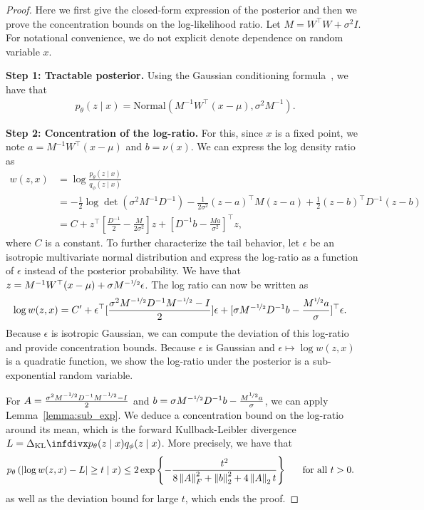 \begin{proof}
    Here we first give the closed-form expression of the posterior and then we prove the concentration bounds on the log-likelihood ratio. Let $M = W^\top W+\sigma^2I$. For notational convenience, we do not explicit denote dependence on random variable $x$.
    
    \textbf{Step 1: Tractable posterior.} Using the Gaussian conditioning formula~\cite{Bishop:2006:PRM:1162264}, we have that 
    \begin{align}
        p_\theta(z \mid x) = \textrm{Normal}\left(M^{-1}W^\top (x - \mu), \sigma^2M^{-1}\right).
    \end{align} 
    
    \textbf{Step 2: Concentration of the log-ratio.} For this, since $x$ is a fixed point, we note $a = M^{-1}W^\top (x - \mu)$ and $b = \nu(x)$. We can express the log density ratio as
    \begin{align}
        w(z, x) &= \log \frac{p_\theta(z \mid x)}{q_\phi(z \mid x)} \\
        &= -\frac{1}{2}\log\det(\sigma^2M^{-1} D^{-1}) -\frac{1}{2\sigma^2}(z - a)^\top M(z-a) + \frac{1}{2}(z - b)^\top D^{-1}(z - b) \\
        &= C + z^\top [\frac{D^{-1}}{2}-\frac{M}{2\sigma^2}]z + [D^{-1}b -\frac{Ma}{\sigma^2}]^\top z,
    \end{align}
    where $C$ is a constant. To further characterize the tail behavior, let $\epsilon$ be an isotropic multivariate normal distribution and express the log-ratio as a function of $\epsilon$ instead of the posterior probability. We have that $z = M^{-1}W^\top (x - \mu) + \sigma M^{-\nicefrac{1}{2}}\epsilon$. The log ratio can now be written as
    \begin{align}
        \log w(z, x) &= C' + \epsilon^\top [\frac{\sigma^2M^{-\nicefrac{1}{2}}D^{-1}M^{-\nicefrac{1}{2}} - I}{2}]\epsilon + [\sigma M^{-\nicefrac{1}{2}}D^{-1}b -\frac{M^{\nicefrac{1}{2}}a}{\sigma}]^\top \epsilon.
    \end{align}
    Because $\epsilon$ is isotropic Gaussian, we can compute the deviation of this log-ratio and provide concentration bounds. Because $\epsilon$ is Gaussian and $\epsilon \mapsto \log w(z, x)$ is a quadratic function, we show the log-ratio under the posterior is a sub-exponential random variable. 
    
    For $A = \frac{\sigma^2M^{-\nicefrac{1}{2}}D^{-1}M^{-\nicefrac{1}{2}} - I}{2}$ and $b = \sigma M^{-\nicefrac{1}{2}}D^{-1}b -\frac{M^{\nicefrac{1}{2}}a}{\sigma}$, we can apply Lemma~\ref{lemma:sub_exp}. We deduce a concentration bound on the log-ratio around its mean, which is the forward Kullback-Leibler divergence $L = \kl{p_\theta(z \mid x)}{q_\phi(z \mid x)}$. More precisely, we have that
    \begin{align}
        p_\theta\left(\left|\log w(z, x) - L\right| \geq t \mid x\right) & \leq 2 \exp\left\{-\frac{t^2}{8\left\lVert A\right\rVert^2_F + \left\lVert b\right\rVert_2^2 + 4\left\lVert A\right\rVert_2t}\right\}~~~~~\textrm{for all}~t >0.
    \end{align}
    as well as the deviation bound for large $t$, which ends the proof.     
    \end{proof}

